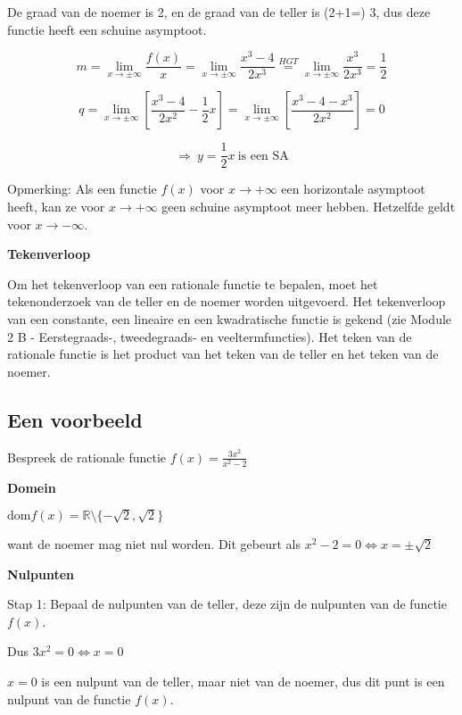 De graad van de noemer is 2, en de graad van de teller is (2+1=) 3,
dus deze functie heeft een schuine asymptoot.

\[
{\displaystyle m={\displaystyle \lim_{x\to\pm\infty}}\frac{f(x)}{x}={\displaystyle \lim_{x\to\pm\infty}}\frac{x^{3}-4}{2x^{3}}\overset{HGT}{=}{\displaystyle \lim_{x\to\pm\infty}}\frac{x^{3}}{2x^{3}}=\frac{1}{2}}
\]


\[
{\displaystyle q={\displaystyle \lim_{x\to\pm\infty}}\left[\frac{x^{3}-4}{2x^{2}}-\frac{1}{2}x\right]={\displaystyle \lim_{x\to\pm\infty}}\left[\frac{x^{3}-4-x^{3}}{2x^{2}}\right]=0}
\]


\[
{\displaystyle \Rightarrow\:y=\frac{1}{2}x\:\textrm{is een SA}}
\]


Opmerking: Als een functie $f(x)$ voor $x\rightarrow+\infty$ een
horizontale asymptoot heeft, kan ze voor $x\rightarrow+\infty$ geen
schuine asymptoot meer hebben. Hetzelfde geldt voor $x\rightarrow-\infty$.

\medskip{}


\noindent \textbf{Tekenverloop}

Om het tekenverloop van een rationale functie te bepalen, moet het
tekenonderzoek van de teller en de noemer worden uitgevoerd. Het tekenverloop
van een constante, een lineaire en een kwadratische functie is gekend
(zie Module 2 B - Eerstegraads-, tweedegraads- en veeltermfuncties).
Het teken van de rationale functie is het product van het teken van
de teller en het teken van de noemer.


\subsection{Een voorbeeld}

Bespreek de rationale functie ${\displaystyle f(x)=\frac{3x^{2}}{x^{2}-2}}$

\textbf{Domein}

$\textrm{dom}f(x)=\mathbb{R}\setminus\{-\sqrt{2},\sqrt{2}\}$

want de noemer mag niet nul worden. Dit gebeurt als ${\displaystyle x^{2}-2=0}\Longleftrightarrow x=\pm\sqrt{2}$ 

\medskip{}


\textbf{Nulpunten}

Stap 1: Bepaal de nulpunten van de teller, deze zijn de nulpunten
van de functie $f(x)$.

Dus ${\displaystyle 3x^{2}=0}\Longleftrightarrow x=0$ 

$x=0$ is een nulpunt van de teller, maar niet van de noemer, dus
dit punt is een nulpunt van de functie $f(x)$.\medskip{}


